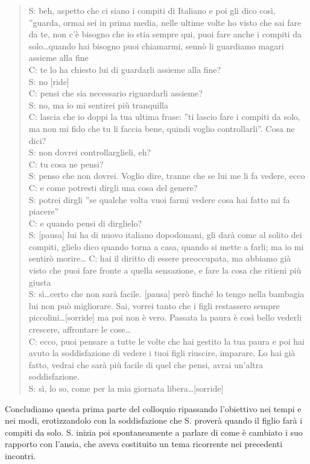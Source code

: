 \begin{verse}
S: beh, aspetto che ci siano i compiti di Italiano e poi gli dico così, ''guarda, ormai sei in prima media, nelle ultime volte ho visto che sai fare da te, non c'è bisogno che io stia sempre qui, puoi fare anche i compiti da solo\ldots quando hai bisogno puoi chiamarmi, sennò li guardiamo magari assieme alla fine\\
C: te lo ha chiesto lui di guardarli assieme alla fine?\\
S: no [ride]\\
C: pensi che sia necessario riguardarli assieme?\\
S: no, ma io mi sentirei più tranquilla\\
C: lascia che io doppi la tua ultima frase: ''ti lascio fare i compiti da solo, ma non mi fido che tu li faccia bene, quindi voglio controllarli''. Cosa ne dici?\\
S: non dovrei controllarglieli, eh?\\
C: tu cosa ne pensi?\\
S: penso che non dovrei. Voglio dire, tranne che se lui me li fa vedere, ecco\\
C: e come potresti dirgli una cosa del genere?\\
S: potrei dirgli ''se qualche volta vuoi farmi vedere cosa hai fatto mi fa piacere''\\
C: e quando pensi di dirglielo?\\
S: [pausa] lui ha di nuovo italiano dopodomani, gli darà come al solito dei compiti, glielo dico quando torna a casa, quando si mette a farli; ma io mi sentirò morire\ldots
C: hai il diritto di essere preoccupata, ma abbiamo già visto che puoi fare fronte a quella sensazione, e fare la cosa che ritieni più giusta\\
S: sì\ldots certo che non sarà facile. [pausa] però finché lo tengo nella bambagia lui non può migliorare. Sai, vorrei tanto che i figli restassero sempre piccolini\ldots [sorride] ma poi non è vero. Passata la paura è così bello vederli crescere, affrontare le cose\ldots\\
C: ecco, puoi pensare a tutte le volte che hai gestito la tua paura e poi hai avuto la soddisfazione di vedere i tuoi figli riuscire, imparare. Lo hai già fatto, vedrai che sarà più facile di quel che pensi, avrai un'altra soddisfazione.\\
S: sì, lo so, come per la mia giornata libera\ldots [sorride]
\end{verse}

\noindent Concludiamo questa prima parte del colloquio ripassando l'obiettivo nei tempi e nei modi,  erotizzandolo con la soddisfazione che S. proverà quando il figlio farà i compiti da solo. S. inizia poi spontaneamente a parlare di come è cambiato i suo rapporto con l'ansia, che aveva costituito un tema ricorrente nei precedenti incontri.

